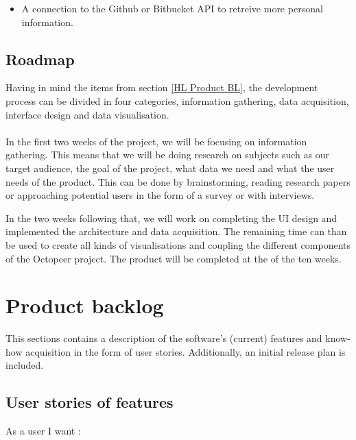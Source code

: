 \documentclass{article}
\begin{document}
    \begin{itemize}
        \item A connection to the Github or Bitbucket API to retreive more personal information.
    \end{itemize}
    
    \subsection{Roadmap}
    
    Having in mind the items from section \ref{HL Product BL}, the development process can be divided in four categories, information gathering, data acquisition, interface design and data visualisation. 
    \\ \\
    In the first two weeks of the project, we will be focusing on information gathering. This means that we will be doing research on subjects such as our target audience, the goal of the project, what data we need and what the user needs of the product. This can be done by brainstorming, reading research papers or approaching potential users in the form of a survey or with interviews.

    In the two weeks following that, we will work on completing the UI design and implemented the architecture and data acquisition. The remaining time can than be used to create all kinds of visualisations and coupling the different components of the Octopeer project. The product will be completed at the of the ten weeks.
    
\section{Product backlog} 

This sections contains a description of the software's (current) features and know-how acquisition in the form of user stories. Additionally, an initial release plan is included.

    \subsection{User stories of features}
    
    As a user I want :
    
\end{document}
